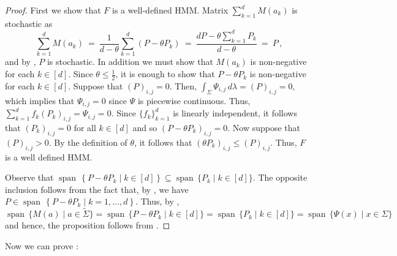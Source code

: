 \documentclass[a4paper,UKenglish,cleveref, autoref,mathscr, amsthm, thmtools, thm-restate]{lipics-v2019}
\newcommand{\1}{\mathbb{I}}
\DeclareMathOperator{\Span}{span\,}
\begin{document}
\begin{proof}
First we show that $F$ is a well-defined HMM. Matrix $\sum_{k=1}^d M(a_k)$ is stochastic as
\begin{equation}\label{sumofps}
\sum_{k=1}^d M(a_k) \ = \ \frac{1}{d - \theta}\sum_{k = 1}^d (P - \theta P_k) \ = \ \frac{dP - \theta \sum_{k=1}^d P_k}{d - \theta} \ = \ P\,,
\end{equation}
and by , $P$ is stochastic. In addition we must show that $M(a_k)$ is non-negative for each $k \in [d]$.
Since $\theta \le \frac12$, it is enough to show that $P - \theta P_k$ is non-negative for each $k \in [d]$. Suppose that $(P)_{i,j} = 0$.
Then, $\int_\Sigma \Psi_{i,j}\, d\lambda = (P)_{i,j} = 0$, which implies that $\Psi_{i,j} = 0$ since $\Psi$ is piecewise continuous.
Thus, $\sum_{k = 1}^d f_k (P_k)_{i,j} = \Psi_{i,j} = 0$.
Since $\{f_k\}_{k=1}^d$ is linearly independent, it follows that $(P_k)_{i,j} = 0$ for all $k \in [d]$ and so $(P - \theta P_k)_{i,j} = 0$.
Now suppose that $(P)_{i,j} > 0$. By the definition of $\theta$, it follows that $(\theta P_k)_{i,j} \leq (P)_{i,j}$. %
Thus, $F$ is a well defined HMM.

Observe that $\Span \left\{ P - \theta P_k \mid k \in [d] \right\} \subseteq \Span \{P_k \mid k \in [d]\}$.
The opposite inclusion follows from the fact that, by , we have $P \in \Span \left\{ P - \theta P_k \mid k = 1, \dots, d \right\}$.
Thus, by ,
\[\Span\{M(a) \mid a \in \tilde{\Sigma}\} = \Span\{P - \theta P_k \mid k \in [d]\} = \Span\{P_k  \mid k \in [d]\} = \Span\{\Psi(x) \mid x \in \Sigma\}\,\]
and hence, the proposition follows from .
\end{proof}

Now we can prove :
\end{document}
